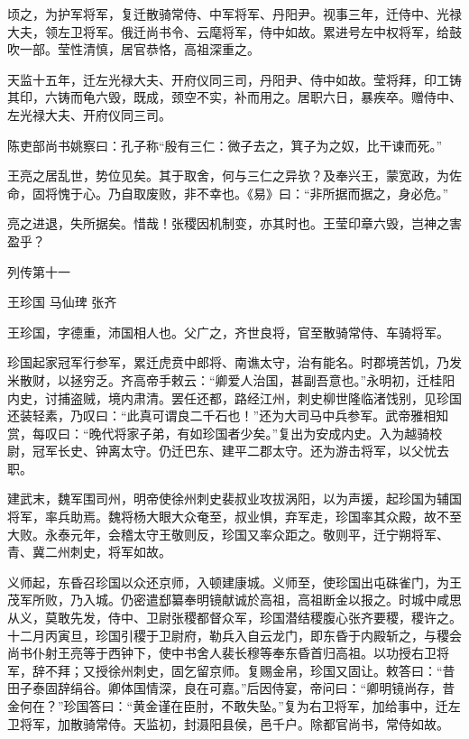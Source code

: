 \documentclass[12pt,UTF8]{ctexbook}
\begin{document}
顷之，为护军将军，复迁散骑常侍、中军将军、丹阳尹。视事三年，迁侍中、光禄大夫，领左卫将军。俄迁尚书令、云麾将军，侍中如故。累进号左中权将军，给鼓吹一部。莹性清慎，居官恭恪，高祖深重之。

天监十五年，迁左光禄大夫、开府仪同三司，丹阳尹、侍中如故。莹将拜，印工铸其印，六铸而龟六毁，既成，颈空不实，补而用之。居职六日，暴疾卒。赠侍中、左光禄大夫、开府仪同三司。

陈吏部尚书姚察曰：孔子称“殷有三仁：微子去之，箕子为之奴，比干谏而死。”

王亮之居乱世，势位见矣。其于取舍，何与三仁之异欤？及奉兴王，蒙宽政，为佐命，固将愧于心。乃自取废败，非不幸也。《易》曰：“非所据而据之，身必危。”

亮之进退，失所据矣。惜哉！张稷因机制变，亦其时也。王莹印章六毁，岂神之害盈乎？





列传第十一

王珍国 马仙琕 张齐

王珍国，字德重，沛国相人也。父广之，齐世良将，官至散骑常侍、车骑将军。

珍国起家冠军行参军，累迁虎贲中郎将、南谯太守，治有能名。时郡境苦饥，乃发米散财，以拯穷乏。齐高帝手敕云：“卿爱人治国，甚副吾意也。”永明初，迁桂阳内史，讨捕盗贼，境内肃清。罢任还都，路经江州，刺史柳世隆临渚饯别，见珍国还装轻素，乃叹曰：“此真可谓良二千石也！”还为大司马中兵参军。武帝雅相知赏，每叹曰：“晚代将家子弟，有如珍国者少矣。”复出为安成内史。入为越骑校尉，冠军长史、钟离太守。仍迁巴东、建平二郡太守。还为游击将军，以父忧去职。

建武末，魏军围司州，明帝使徐州刺史裴叔业攻拔涡阳，以为声援，起珍国为辅国将军，率兵助焉。魏将杨大眼大众奄至，叔业惧，弃军走，珍国率其众殿，故不至大败。永泰元年，会稽太守王敬则反，珍国又率众距之。敬则平，迁宁朔将军、青、冀二州刺史，将军如故。

义师起，东昏召珍国以众还京师，入顿建康城。义师至，使珍国出屯硃雀门，为王茂军所败，乃入城。仍密遣郄纂奉明镜献诚於高祖，高祖断金以报之。时城中咸思从义，莫敢先发，侍中、卫尉张稷都督众军，珍国潜结稷腹心张齐要稷，稷许之。十二月丙寅旦，珍国引稷于卫尉府，勒兵入自云龙门，即东昏于内殿斩之，与稷会尚书仆射王亮等于西钟下，使中书舍人裴长穆等奉东昏首归高祖。以功授右卫将军，辞不拜；又授徐州刺史，固乞留京师。复赐金帛，珍国又固让。敕答曰：“昔田子泰固辞绢谷。卿体国情深，良在可嘉。”后因侍宴，帝问曰：“卿明镜尚存，昔金何在？”珍国答曰：“黄金谨在臣肘，不敢失坠。”复为右卫将军，加给事中，迁左卫将军，加散骑常侍。天监初，封滠阳县侯，邑千户。除都官尚书，常侍如故。
\end{document}
